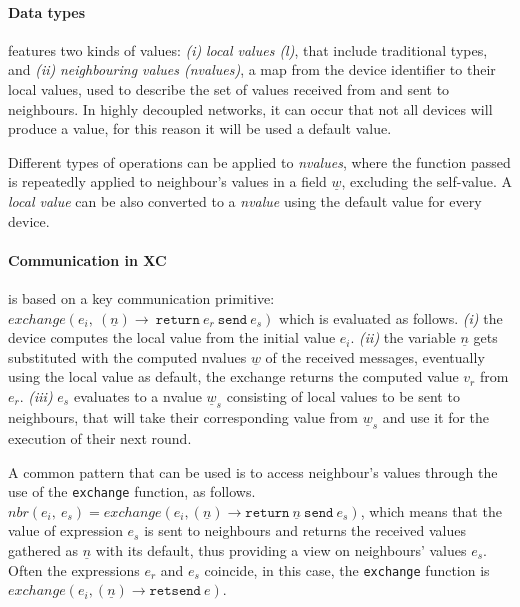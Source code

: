\paragraph{Data types}
\label{par:data-types}
\xc{} features two kinds of values:
    \emph{(i)} \emph{local values (l)}, that include traditional types, and
    \emph{(ii)} \emph{neighbouring values (nvalues)}, a map from the device identifier to their local values, used to describe
        the set of values received from and sent to neighbours.
In highly decoupled networks, it can occur that not all devices will produce a value, for this reason it will be used
a default value.

Different types of operations can be applied to \emph{nvalues}, where the function passed is repeatedly applied to
neighbour's values in a field $\underline{w}$, excluding the self-value.
A \emph{local value} can be also converted to a \emph{nvalue} using the default value for every device.

\paragraph{Communication in XC}
\label{par:communication-in-xc}

\xc{} is based on a key communication primitive:\\ $exchange(e_i,\ (\underline{n}) \rightarrow \ \texttt{return} \ e_r \ \texttt{send} \ e_s)$
which is evaluated as follows.
    \emph{(i)} the device computes the local value from the initial value $e_i$.
    \emph{(ii)} the variable $\underline{n}$ gets substituted with the computed nvalues $\underline{w}$ of the received messages, eventually
        using the local value as default, the exchange returns the computed value $v_r$ from $e_r$.
    \emph{(iii)} $e_s$ evaluates to a nvalue $\underline{w}_s$ consisting of local values to be sent to neighbours,
        that will take their corresponding value from $\underline{w}_s$ and use it for the execution of their next round.

A common pattern that can be used is to access neighbour's values through the use of the \texttt{exchange} function, as follows.\\
$nbr(e_i,\ e_s) = exchange(e_i, (\underline{n}) \rightarrow \texttt{return} \ \underline{n} \ \texttt{send} \ e_s)$,
which means that the value of expression $e_s$ is sent to neighbours and returns the received values gathered as
$\underline{n}$ with its default, thus providing a view on neighbours' values $e_s$.
Often the expressions $e_r$ and $e_s$ coincide, in this case, the \texttt{exchange} function is
$exchange(e_i, (\underline{n}) \rightarrow \texttt{retsend} \ e)$.

